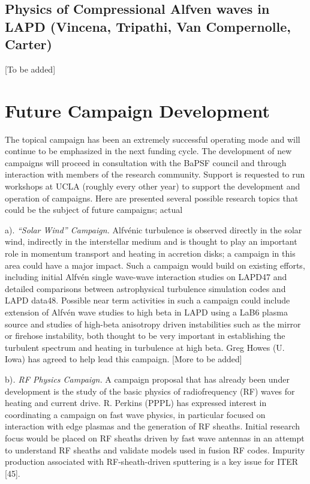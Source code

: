 \documentclass[11pt]{article}
\begin{document}
\subsection{Physics of Compressional Alfven waves in LAPD (Vincena, Tripathi,
Van Compernolle, Carter)}

{[}To be added{]}


\section{Future Campaign Development}

The topical campaign has been an extremely successful operating mode and
will continue to be emphasized in the next funding cycle. The
development of new campaigns will proceed in consultation with the BaPSF
council and through interaction with members of the research community.
Support is requested to run workshops at UCLA (roughly every other year)
to support the development and operation of campaigns. Here are
presented several possible research topics that could be the subject of
future campaigns; actual

a). \emph{``Solar Wind'' Campaign.} Alfvénic turbulence is observed
directly in the solar wind, indirectly in the interstellar medium and is
thought to play an important role in momentum transport and heating in
accretion disks; a campaign in this area could have a major impact. Such
a campaign would build on existing efforts, including initial Alfvén
single wave-wave interaction studies on LAPD47 and detailed comparisons
between astrophysical turbulence simulation codes and LAPD data48.
Possible near term activities in such a campaign could include extension
of Alfvén wave studies to high beta in LAPD using a LaB6 plasma source
and studies of high-beta anisotropy driven instabilities such as the
mirror or firehose instability, both thought to be very important in
establishing the turbulent spectrum and heating in turbulence at high
beta. Greg Howes (U. Iowa) has agreed to help lead this campaign.
{[}More to be added{]}

b)\emph{. RF Physics Campaign.} A campaign proposal that has already
been under development is the study of the basic physics of
radiofrequency (RF) waves for heating and current drive. R. Perkins
(PPPL) has expressed interest in coordinating a campaign on fast wave
physics, in particular focused on interaction with edge plasmas and the
generation of RF sheaths. Initial research focus would be placed on RF
sheaths driven by fast wave antennas in an attempt to understand RF
sheaths and validate models used in fusion RF codes. Impurity production
associated with RF-sheath-driven sputtering is a key issue for ITER
{[}45{]}.
\end{document}
